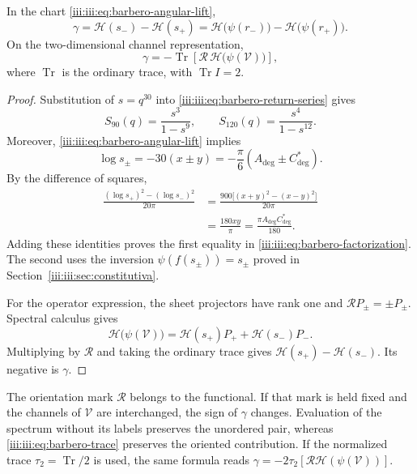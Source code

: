 \begin{theorem}
\label{iii:iii:thm:barbero-factorization}
In the chart \eqref{iii:iii:eq:barbero-angular-lift},
\begin{equation}
 \gamma=\mathcal H(s_-)-\mathcal H(s_+)
       =\mathcal H\bigl(\psi(r_-)\bigr)
        -\mathcal H\bigl(\psi(r_+)\bigr).
 \label{iii:iii:eq:barbero-factorization}
\end{equation}
On the two-dimensional channel representation,
\begin{equation}
 \gamma=-\operatorname{Tr}
    \left[\mathcal R\,\mathcal H\bigl(\psi(\mathcal V)\bigr)\right],
 \label{iii:iii:eq:barbero-trace}
\end{equation}
where $\operatorname{Tr}$ is the ordinary trace, with
$\operatorname{Tr}I=2$.
\end{theorem}
\begin{proof}
Substitution of $s=q^{30}$ into \eqref{iii:iii:eq:barbero-return-series} gives
\[
 S_{90}(q)=\frac{s^3}{1-s^9},\qquad
 S_{120}(q)=\frac{s^4}{1-s^{12}}.
\]
Moreover, \eqref{iii:iii:eq:barbero-angular-lift} implies
\[
 \log s_\pm=-30(x\pm y)
 =-\frac\pi6(A_{\deg}\pm C^*_{\deg}).
\]
By the difference of squares,
\begin{align}
 \frac{(\log s_+)^2-(\log s_-)^2}{20\pi}
 &=\frac{900\bigl[(x+y)^2-(x-y)^2\bigr]}{20\pi}\\
 &=\frac{180xy}{\pi}
 =\frac{\pi A_{\deg}C^*_{\deg}}{180}.
 \label{iii:iii:eq:barbero-log-term}
\end{align}
Adding these identities proves the first equality in
\eqref{iii:iii:eq:barbero-factorization}. The second uses the inversion
$\psi(f(s_\pm))=s_\pm$ proved in
Section~\ref{iii:iii:sec:constitutiva}.

For the operator expression, the sheet projectors have rank one and
$\mathcal RP_\pm=\pm P_\pm$. Spectral calculus gives
\[
 \mathcal H\bigl(\psi(\mathcal V)\bigr)
 =\mathcal H(s_+)P_++\mathcal H(s_-)P_-.
\]
Multiplying by $\mathcal R$ and taking the ordinary trace gives
$\mathcal H(s_+)-\mathcal H(s_-)$. Its negative is $\gamma$.
\end{proof}

The orientation mark $\mathcal R$ belongs to the functional. If that
mark is held fixed and the channels of $\mathcal V$ are interchanged,
the sign of $\gamma$ changes. Evaluation of the spectrum without its labels preserves
the unordered pair, whereas \eqref{iii:iii:eq:barbero-trace} preserves the
oriented contribution. If the normalized trace
$\tau_2=\operatorname{Tr}/2$ is used, the same formula reads
$\gamma=-2\tau_2[\mathcal R\mathcal H(\psi(\mathcal V))]$.

